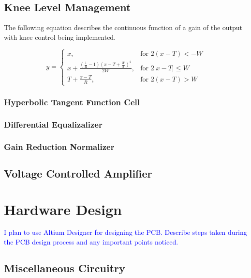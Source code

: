 \documentclass[10pt]{article}
\begin{document}
\begin{multicols*}{2}
            \subsection{Knee Level Management}
                The following equation describes the continuous function of a gain of the output with knee control being implemented.

                \begin{equation}
                    y=
                    \begin{cases}
                        x, & \text{for $2(x-T)<-W$}\\
                        x+\frac{(\frac{1}{R}-1)(x-T+\frac{W}{2})^2}{2W}, & \text{for $2\left\lvert x-T\right\rvert\leq W$}\\
                        T+\frac{x-T}{R}, & \text{for $2(x-T)>W$}
                    \end{cases}
                \end{equation}

                \subsubsection{Hyperbolic Tangent Function Cell}
                \subsubsection{Differential Equalizalizer}
                \subsubsection{Gain Reduction Normalizer}

            \subsection{Voltage Controlled Amplifier}

        \section{Hardware Design}
            \textcolor{blue}{I plan to use Altium Designer for designing the PCB. Describe steps taken during the PCB design process and any important points noticed.}

            \subsection{Miscellaneous Circuitry}


\end{multicols*}
\end{document}
